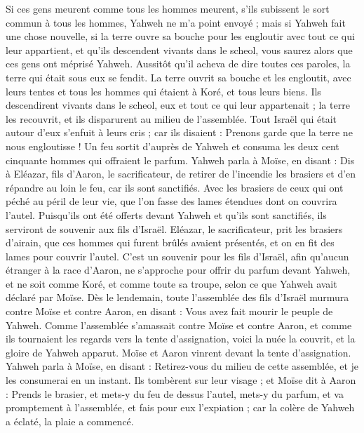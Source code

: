 \begin{multicols}{2}
Si ces gens meurent comme tous les hommes meurent, s'ils subissent le sort commun à tous les hommes, Yahweh ne m'a point envoyé ;
mais si Yahweh fait une chose nouvelle, si la terre ouvre sa bouche pour les engloutir avec tout ce qui leur appartient, et qu'ils descendent vivants dans le scheol, vous saurez alors que ces gens ont méprisé Yahweh.
Aussitôt qu'il acheva de dire toutes ces paroles, la terre qui était sous eux se fendit.
La terre ouvrit sa bouche et les engloutit, avec leurs tentes et tous les hommes qui étaient à Koré, et tous leurs biens.
Ils descendirent vivants dans le scheol, eux et tout ce qui leur appartenait ; la terre les recouvrit, et ils disparurent au milieu de l'assemblée.
Tout Israël qui était autour d'eux s'enfuit à leurs cris ; car ils disaient : Prenons garde que la terre ne nous engloutisse !
Un feu sortit d’auprès de Yahweh et consuma les deux cent cinquante hommes qui offraient le parfum.
Yahweh parla à Moïse, en disant :
Dis à Eléazar, fils d'Aaron, le sacrificateur, de retirer de l’incendie les brasiers et d’en répandre au loin le feu, car ils sont sanctifiés.
Avec les brasiers de ceux qui ont péché au péril de leur vie, que l'on fasse des lames étendues dont on couvrira l'autel. Puisqu'ils ont été offerts devant Yahweh et qu’ils sont sanctifiés, ils serviront de souvenir aux fils d'Israël.
Eléazar, le sacrificateur, prit les brasiers d'airain, que ces hommes qui furent brûlés avaient présentés, et on en fit des lames pour couvrir l'autel.
C'est un souvenir pour les fils d'Israël, afin qu'aucun étranger à la race d'Aaron, ne s'approche pour offrir du parfum devant Yahweh, et ne soit comme Koré, et comme toute sa troupe, selon ce que Yahweh avait déclaré par Moïse.
Dès le lendemain, toute l'assemblée des fils d'Israël murmura contre Moïse et contre Aaron, en disant : Vous avez fait mourir le peuple de Yahweh.
Comme l'assemblée s'amassait contre Moïse et contre Aaron, et comme ils tournaient les regards vers la tente d'assignation, voici la nuée la couvrit, et la gloire de Yahweh apparut.
Moïse et Aaron vinrent devant la tente d'assignation.
Yahweh parla à Moïse, en disant :
Retirez-vous du milieu de cette assemblée, et je les consumerai en un instant. Ils tombèrent sur leur visage ;
et Moïse dit à Aaron : Prends le brasier, et mets-y du feu de dessus l'autel, mets-y du parfum, et va promptement à l'assemblée, et fais pour eux l’expiation ; car la colère de Yahweh a éclaté, la plaie a commencé.

\end{multicols}
